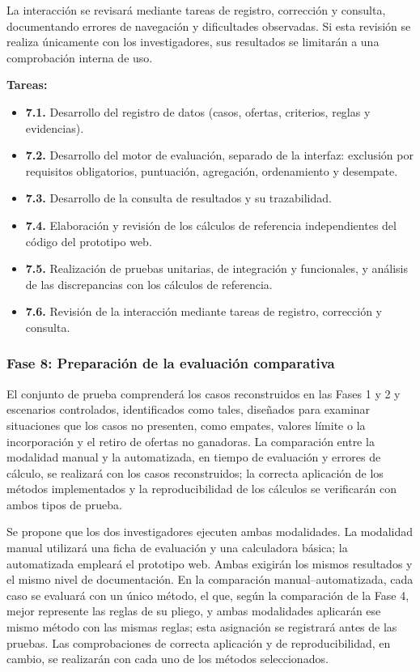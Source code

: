 \documentclass[12pt,a4paper]{article}
\begin{document}
La interacción se revisará mediante tareas de registro, corrección y consulta, documentando errores de navegación y dificultades observadas. Si esta revisión se realiza únicamente con los investigadores, sus resultados se limitarán a una comprobación interna de uso.

\textbf{Tareas:}

\begin{itemize}
\item \textbf{7.1.} Desarrollo del registro de datos (casos, ofertas, criterios, reglas y evidencias).
\item \textbf{7.2.} Desarrollo del motor de evaluación, separado de la interfaz: exclusión por requisitos obligatorios, puntuación, agregación, ordenamiento y desempate.
\item \textbf{7.3.} Desarrollo de la consulta de resultados y su trazabilidad.
\item \textbf{7.4.} Elaboración y revisión de los cálculos de referencia independientes del código del prototipo web.
\item \textbf{7.5.} Realización de pruebas unitarias, de integración y funcionales, y análisis de las discrepancias con los cálculos de referencia.
\item \textbf{7.6.} Revisión de la interacción mediante tareas de registro, corrección y consulta.
\end{itemize}

\subsubsection{Fase 8: Preparación de la evaluación comparativa}

El conjunto de prueba comprenderá los casos reconstruidos en las Fases 1 y 2 y escenarios controlados, identificados como tales, diseñados para examinar situaciones que los casos no presenten, como empates, valores límite o la incorporación y el retiro de ofertas no ganadoras. La comparación entre la modalidad manual y la automatizada, en tiempo de evaluación y errores de cálculo, se realizará con los casos reconstruidos; la correcta aplicación de los métodos implementados y la reproducibilidad de los cálculos se verificarán con ambos tipos de prueba.

Se propone que los dos investigadores ejecuten ambas modalidades. La modalidad manual utilizará una ficha de evaluación y una calculadora básica; la automatizada empleará el prototipo web. Ambas exigirán los mismos resultados y el mismo nivel de documentación. En la comparación manual–automatizada, cada caso se evaluará con un único método, el que, según la comparación de la Fase 4, mejor represente las reglas de su pliego, y ambas modalidades aplicarán ese mismo método con las mismas reglas; esta asignación se registrará antes de las pruebas. Las comprobaciones de correcta aplicación y de reproducibilidad, en cambio, se realizarán con cada uno de los métodos seleccionados.
\end{document}
